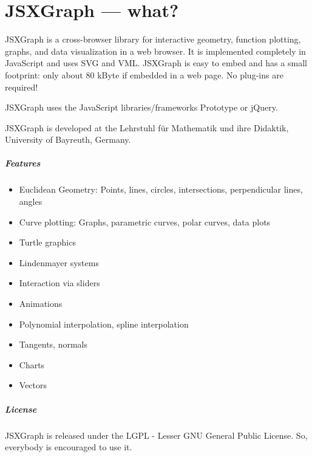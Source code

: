 \documentclass[a4paper,nols]{tufte-book}
\begin{document}
\mainmatter

\chapter{JSXGraph --- what?}
\label{ch:what}


JSXGraph is a cross-browser library for interactive geometry, function plotting, graphs, and data visualization in a web browser. It is implemented completely in JavaScript and uses SVG and VML.
JSXGraph is easy to embed and has a small footprint: only about 80 kByte if embedded in a web page. No plug-ins are required! 

JSXGraph uses the JavaScript libraries/frameworks Prototype or jQuery.

JSXGraph is developed at the Lehrstuhl f\"ur Mathematik und ihre Didaktik, University of Bayreuth, Germany.


\paragraph{Features}
\begin{itemize}
    \item Euclidean Geometry: Points, lines, circles, intersections, perpendicular lines, angles
    \item  Curve plotting: Graphs, parametric curves, polar curves, data plots
    \item  Turtle graphics
    \item  Lindenmayer systems
    \item  Interaction via sliders
    \item  Animations
    \item  Polynomial interpolation, spline interpolation
    \item  Tangents, normals
    \item  Charts
    \item  Vectors
\end{itemize}

\paragraph{License}

JSXGraph is released under the LGPL - Lesser GNU General Public License. So, everybody is encouraged to use it.
\end{document}
